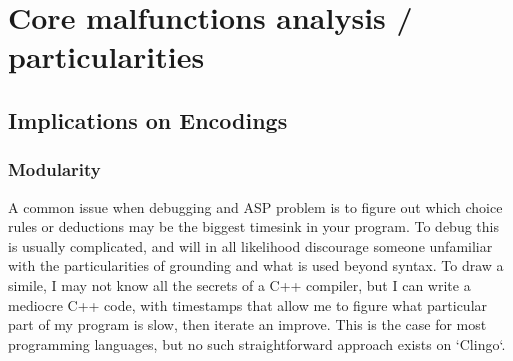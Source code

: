 \section{Core malfunctions analysis / particularities}
\subsection{Implications on Encodings}






\subsubsection{Modularity}

A common issue when debugging and ASP problem is to figure out which choice rules or deductions may be the biggest timesink in your program. To debug this is usually complicated, and will in all likelihood discourage someone unfamiliar with the particularities of grounding and what is used beyond syntax. To draw a simile, I may not know all the secrets of a C++ compiler, but I can write a mediocre C++ code, with timestamps that allow me to figure what particular part of my program is slow, then iterate an improve. This is the case for most programming languages, but no such straightforward approach exists on `Clingo`.

